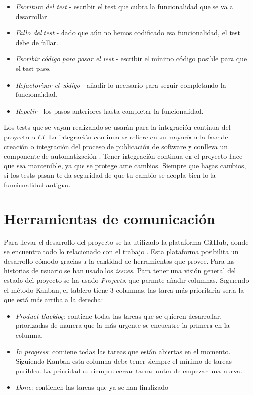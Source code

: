\begin{itemize}
    \item \textit{Escritura del test} - escribir el test que cubra la funcionalidad que se va a desarrollar
    \item \textit{Fallo del test} - dado que aún no hemos codificado esa funcionalidad, el test debe de fallar.
    \item \textit{Escribir código para pasar el test} - escribir el mínimo código posible para que el test pase.
    \item \textit{Refactorizar el código} - añadir lo necesario para seguir completando la funcionalidad.
    \item \textit{Repetir} - los pasos anteriores hasta completar la funcionalidad.
\end{itemize}

Los tests que se vayan realizando se usarán para la integración continua del proyecto o \emph{CI}.
La integración continua se refiere en su mayoría a la fase de creación o integración del proceso de publicación de
software y conlleva un componente de automatización \cite{CI}. Tener integración continua en el proyecto hace que sea
mantenible, ya que se protege ante cambios. Siempre que hagas cambios, si los tests pasan te da seguridad de que tu cambio se 
acopla bien lo la funcionalidad antigua. 


\section{Herramientas de comunicación}

Para llevar el desarrollo del proyecto se ha utilizado la plataforma GitHub, donde se encuentra todo lo 
relacionado con el trabajo \cite{project_repository}. Esta plataforma posibilita un desarrollo cómodo gracias a la cantidad
de herramientas que provee. Para las historias de usuario se han usado los \textit{issues}. Para tener una
visión general del estado del proyecto se ha usado \textit{Projects}, que permite añadir columnas. Siguiendo el método Kanban, el
tablero tiene 3 columnas, las tarea más prioritaria sería la que está más arriba a la derecha:

\begin{itemize}
    \item \emph{Product Backlog}: contiene todas las tareas que se quieren desarrollar, priorizadas de manera que la más urgente
    se encuentre la primera en la columna.
    \item \emph{In progress}: contiene todas las tareas que están abiertas en el momento. Siguiendo Kanban esta columna
    debe tener siempre el mínimo de tareas posibles. La prioridad es siempre cerrar tareas antes de empezar una nueva.
    \item \emph{Done}: contienen las tareas que ya se han finalizado
\end{itemize}

